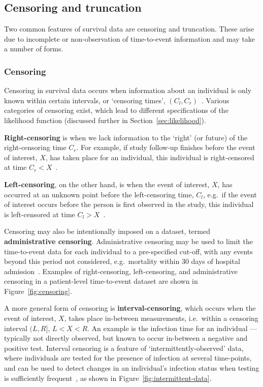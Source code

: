 \subsection{Censoring and truncation}\label{sec:censoring-truncation}

Two common features of survival data are censoring and truncation. These arise due to incomplete or non-observation of time-to-event information and may take a number of forms.

\subsubsection{Censoring}

Censoring in survival data occurs when information about an individual is only known within certain intervals, or `censoring times', $(C_l, C_r)$~\parencite{Klein2005-ls}. Various categories of censoring exist, which lead to different specifications of the likelihood function (discussed further in Section~\ref{sec:likelihood}).

\textbf{Right-censoring} is when we lack information to the `right' (or future) of the right-censoring time $C_r$. For example, if study follow-up finishes before the event of interest, $X$, has taken place for an individual, this individual is right-censored at time $C_r < X$~\parencite{Klein2005-ls}.

\textbf{Left-censoring}, on the other hand, is when the event of interest, $X$, has occurred at an unknown point before the left-censoring time, $C_l$, e.g.\ if the event of interest occurs before the person is first observed in the study, this individual is left-censored at time $C_l > X$~\parencite{Collett2023-bg}.

Censoring may also be intentionally imposed on a dataset, termed \textbf{administrative censoring}. Administrative censoring may be used to limit the time-to-event data for each individual to a pre-specified cut-off, with any events beyond this period not considered, e.g.\ mortality within 30 days of hospital admission~\parencite{Collett2023-bg}. Examples of right-censoring, left-censoring, and administrative censoring in a patient-level time-to-event dataset are shown in Figure~\ref{fig:censoring}.



A more general form of censoring is \textbf{interval-censoring}, which occurs when the event of interest, $X$, takes place in-between measurements, i.e.\ within a censoring interval $(L, R]$, $L < X < R$. An example is the infection time for an individual --- typically not directly observed, but known to occur in-between a negative and positive test. Interval censoring is a feature of `intermittently-observed' data, where individuals are tested for the presence of infection at several time-points, and can be used to detect changes in an individual's infection status when testing is sufficiently frequent~\parencite{van-den-Hout2016-xy, Klein2005-ls}, as shown in Figure~\ref{fig:intermittent-data}.

